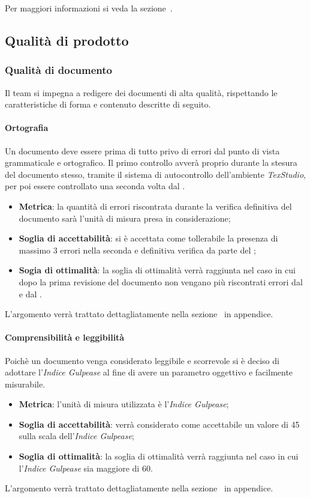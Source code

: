 Per maggiori informazioni si veda la sezione~.

\subsection{Qualità di prodotto}
\subsubsection{Qualità di documento}
Il team si impegna a redigere dei documenti di alta qualità, rispettando le caratteristiche di forma e contenuto descritte di seguito.
\paragraph{Ortografia}
Un documento deve essere prima di tutto privo di errori dal punto di vista grammaticale e ortografico. 
Il primo controllo avverà proprio durante la stesura del documento stesso, tramite il sistema di autocontrollo dell'ambiente  \emph{TexStudio}, per poi essere controllato una seconda volta dal \ver{}.
\begin{itemize}
	\item \textbf{Metrica}: la quantità di errori riscontrata durante la verifica definitiva del documento sarà l'unità di misura presa in considerazione;
	\item \textbf{Soglia di accettabilità}: si è accettata come tollerabile la presenza di massimo 3 errori nella seconda e definitiva verifica da parte del \ver{};
	\item \textbf{Sogia di ottimalità}: la soglia di ottimalità verrà raggiunta nel caso in cui dopo la prima revisione del documento non vengano più riscontrati errori dal \ver{} e dal \RdP{}.
\end{itemize}
L'argomento verrà trattato dettagliatamente nella sezione~ in appendice.

\paragraph{Comprensibilità e leggibilità}
Poichè un documento venga considerato leggibile e scorrevole si è deciso di adottare l'\emph{Indice Gulpease} al fine di avere un parametro oggettivo e facilmente misurabile.
\begin{itemize}
	\item \textbf{Metrica}: l'unità di misura utilizzata è l'\emph{Indice Gulpease};
	\item \textbf{Soglia di accettabilità}: verrà considerato come accettabile un valore di 45 sulla scala dell'\emph{Indice Gulpease};
	\item \textbf{Soglia di ottimalità}: la soglia di ottimalità verrà raggiunta nel caso in cui l'\emph{Indice Gulpease} sia maggiore di 60.
\end{itemize}
L'argomento verrà trattato dettagliatamente nella sezione~ in appendice.

